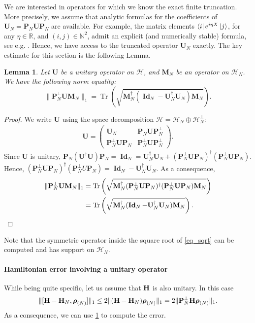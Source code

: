 \documentclass[a4paper,onecolumn,amsmath,amssymb,amsfonts,accepted=2026-03-06]{quantumarticle}
\newcommand{\Id}{\operatorname{\mathbf{Id}}}
\newcommand{\xH}{\mathcal{H}}
\newcommand{\xtr}[1]{\operatorname{Tr}\left(#1 \right)}
\newcommand{\xN}{\mathbb{N}}
\newcommand{\Hamil}{{\bf H}}
\newcommand{\Proj}[1]{\mathbf{P}_{#1}}
\newcommand{\rN}{{\boldsymbol{\rho}_{(N)}}}
\newcommand{\Uop}{\mathbf{U}}
\newtheorem{lemma}{Lemma}
\begin{document}
We are interested in operators for which we know the exact finite truncation. More precisely, we assume that analytic formulas for the coefficients of $\Uop_N=\Proj{N}\Uop\Proj{N}$ are available. For example, the matrix elements $\bra{i}e^{i\eta X}\ket{j}$, for any $\eta \in \mathbb{R}$, and $(i,j)\in \xN^2$, admit an explicit (and numerically stable) formula, see e.g. \cite[Appendix E.3]{PhysRevX.15.011011}. Hence, we have access to the truncated operator $\Uop_N$ exactly. The key estimate for this section is the following Lemma.
\begin{lemma}
    \label{lem_unitary}
    Let $\Uop$ be a unitary operator on $\xH$, and $\mathbf{M}_N$ be an operator on $\xH_N$. We have the following norm equality:
    \begin{equation}
        \label{th:unitary}
        \|\Proj{N}^\perp \Uop \mathbf{M}_N\|_1 = \xtr{\sqrt{\mathbf{M}_N^\dagger(\Id_N - \Uop_N^\dagger \Uop_N)\mathbf{M}_N}}.
    \end{equation}
\end{lemma}
\begin{proof}
    We write $\Uop$ using the space decomposition $\xH=\xH_N \oplus \xH_N^\perp$:
    \begin{align}
        \Uop= \begin{pmatrix}
            \Uop_N&\Proj{N} \Uop \Proj{N}^\perp \\
            \Proj{N}^\perp \Uop \Proj{N}&\Proj{N}^\perp \Uop \Proj{N}^\perp 
        \end{pmatrix}.
    \end{align}
    Since $\Uop$ is unitary, $\Proj{N}( \Uop^\dag \Uop )\Proj{N}=\Id_N=\Uop_N^\dagger \Uop_N + (\Proj{N}^\perp \Uop \Proj{N})^\dagger (\Proj{N}^\perp \Uop \Proj{N})$. Hence, $(\Proj{N}^\perp \Uop \Proj{N})^\dagger (\Proj{N}^\perp U \Proj{N}) = \Id_N - \Uop_N^\dagger \Uop_N$.
    As a consequence,
    \begin{align}
        \notag
        \|\Proj{N}^\perp \Uop \mathbf{M}_N\|_1 &= \xtr{\sqrt{\mathbf{M}_N^\dagger (\Proj{N}^\perp \Uop \Proj{N})^\dagger (\Proj{N}^\perp \Uop \Proj{N}) \mathbf{M}_N}} \\
        \label{eq_sqrt}&= \xtr{\sqrt{\mathbf{M}_N^\dagger (\Id_N - \Uop_N^\dagger \Uop_N) \mathbf{M}_N}}.
    \end{align}
\end{proof}
Note that the symmetric operator inside the square root of \cref{eq_sqrt} can be computed and has support on $\xH_N$.

\paragraph{Hamiltonian error involving a unitary operator}
While being quite specific, let us assume that $\Hamil$ is also unitary. In this case
\begin{align}
    \|[\Hamil-\Hamil_N,\rN]\|_1 \leq 2 \|(\Hamil-\Hamil_N)\rN\|_1 = 2 \|\Proj{N}^\perp \Hamil \rN\|_1.
\end{align}
As a consequence, we can use \cref{lem_unitary} to compute the error.
\end{document}
